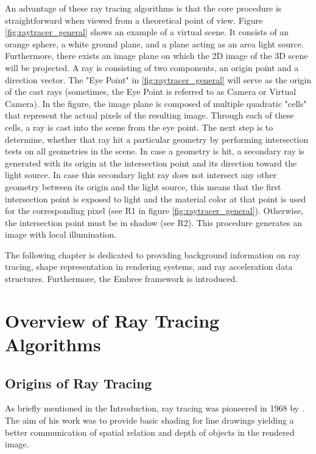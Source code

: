 An advantage of these ray tracing algorithms is that the core procedure is straightforward when viewed from a theoretical point of view. Figure \ref{fig:raytracer_general} shows an example of a virtual scene. It consists of an orange sphere, a white ground plane, and a plane acting as an area light source. Furthermore, there exists an image plane on which the 2D image of the 3D scene will be projected. A ray is consisting of two components, an origin point and a direction vector. The "Eye Point" in \ref{fig:raytracer_general} will serve as the origin of the cast rays (sometimes, the Eye Point is referred to as Camera or Virtual Camera). In the figure, the image plane is composed of multiple quadratic "cells" that represent the actual pixels of the resulting image. Through each of these cells, a ray is cast into the scene from the eye point. The next step is to determine, whether that ray hit a particular geometry by performing intersection tests on all geometries in the scene. In case a geometry is hit, a secondary ray is generated with its origin at the intersection point and its direction toward the light source. In case this secondary light ray does not intersect any other geometry between its origin and the light source, this means that the first intersection point is exposed to light and the material color at that point is used for the corresponding pixel (see R1 in figure \ref{fig:raytracer_general}). Otherwise, the intersection point must be in shadow (see R2). This procedure generates an image with local illumination.

The following chapter is dedicated to providing background information on ray tracing, shape representation in rendering systems, and ray acceleration data structures. Furthermore, the Embree framework is introduced. 

\section{Overview of Ray Tracing Algorithms}


\subsection{Origins of Ray Tracing}
As briefly mentioned in the Introduction, ray tracing was pioneered in 1968 by \cite{appel1968some}. The aim of his work was to provide basic shading for line drawings yielding a better communication of spatial relation and depth of objects in the rendered image.

